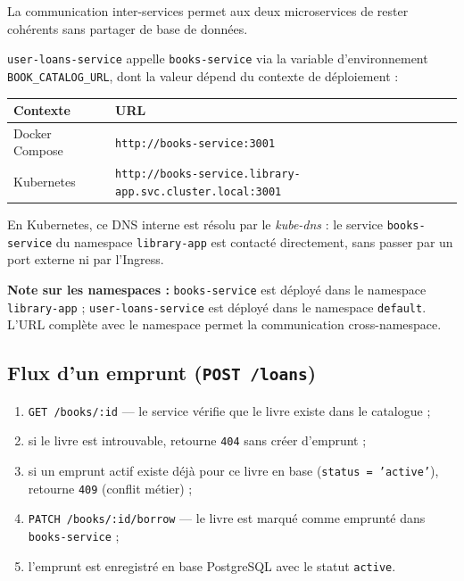 \documentclass[12pt,a4paper]{article}
\begin{document}
La communication inter-services permet aux deux microservices de rester cohérents
sans partager de base de données.

\texttt{user-loans-service} appelle \texttt{books-service} via la variable d'environnement
\texttt{BOOK\_CATALOG\_URL}, dont la valeur dépend du contexte de déploiement :

\begin{center}
\begin{tabular}{p{3.5cm} p{9cm}}
\toprule
\textbf{Contexte} & \textbf{URL} \\
\midrule
Docker Compose & \texttt{http://books-service:3001} \\
Kubernetes     & \texttt{http://books-service.library-app.svc.cluster.local:3001} \\
\bottomrule
\end{tabular}
\end{center}

En Kubernetes, ce DNS interne est résolu par le \textit{kube-dns} :
le service \texttt{books-service} du namespace \texttt{library-app} est contacté directement,
sans passer par un port externe ni par l'Ingress.

\textbf{Note sur les namespaces :} \texttt{books-service} est déployé dans le namespace
\texttt{library-app} ; \texttt{user-loans-service} est déployé dans le namespace \texttt{default}.
L'URL complète avec le namespace permet la communication cross-namespace.

\subsection{Flux d'un emprunt (\texttt{POST /loans})}

\begin{enumerate}[leftmargin=*]
  \item \texttt{GET /books/:id} --- le service vérifie que le livre existe dans le catalogue ;
  \item si le livre est introuvable, retourne \texttt{404} sans créer d'emprunt ;
  \item si un emprunt actif existe déjà pour ce livre en base (\texttt{status = 'active'}), retourne \texttt{409} (conflit métier) ;
  \item \texttt{PATCH /books/:id/borrow} --- le livre est marqué comme emprunté dans \texttt{books-service} ;
  \item l'emprunt est enregistré en base PostgreSQL avec le statut \texttt{active}.
\end{enumerate}
\end{document}

